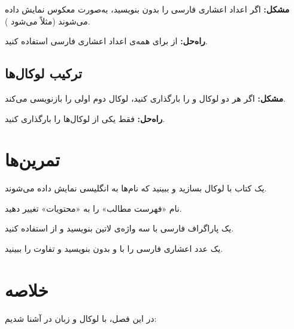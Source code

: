 \textbf{مشکل:} اگر اعداد اعشاری فارسی را
بدون  بنویسید، به‌صورت معکوس
نمایش داده می‌شوند (مثلاً  می‌شود
).

\textbf{راه‌حل:} از  برای همه‌ی
اعداد اعشاری فارسی استفاده کنید.

\subsection{ترکیب لوکال‌ها}
\label{sec:localization-mistake-mixed}

\textbf{مشکل:} اگر هر دو لوکال  و
 را بارگذاری کنید، لوکال دوم
اولی را بازنویسی می‌کند.

\textbf{راه‌حل:} فقط یکی از لوکال‌ها را
بارگذاری کنید.

\section{تمرین‌ها}
\label{sec:localization-exercises}

\begin{exercise}
    یک کتاب با لوکال  بسازید و
    ببینید که نام‌ها به انگلیسی نمایش
    داده می‌شوند.
    \label{exc:localization-en}
\end{exercise}

\begin{exercise}
    نام «فهرست مطالب» را به «محتویات» تغییر
    دهید.
    \label{exc:localization-custom}
\end{exercise}

\begin{exercise}
    یک پاراگراف فارسی با سه واژه‌ی لاتین
    بنویسید و از  استفاده کنید.
    \label{exc:localization-lr}
\end{exercise}

\begin{exercise}
    یک عدد اعشاری فارسی را با و بدون
     بنویسید و تفاوت را ببینید.
    \label{exc:localization-pnum}
\end{exercise}

\section{خلاصه}
\label{sec:localization-summary}

در این فصل، با لوکال و زبان در 
آشنا شدیم:

